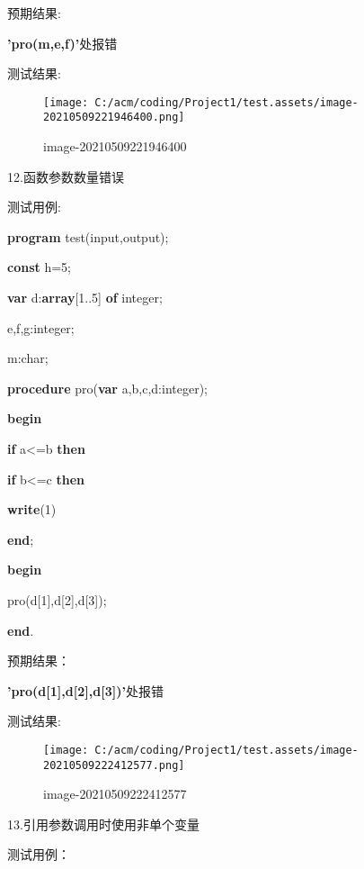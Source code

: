 \documentclass[]{ctexart}
\newenvironment{Shaded}{}{}
\newcommand{\DataTypeTok}[1]{\textcolor[rgb]{0.56,0.13,0.00}{#1}}
\newcommand{\DecValTok}[1]{\textcolor[rgb]{0.25,0.63,0.44}{#1}}
\newcommand{\KeywordTok}[1]{\textcolor[rgb]{0.00,0.44,0.13}{\textbf{#1}}}
\newcommand{\NormalTok}[1]{#1}
\begin{document}
\begin{enumerate}
  预期结果:

  \textbf{'pro(m,e,f)'}处报错

  测试结果:

  \begin{figure}
  \centering
  \texttt{[image: C:/acm/coding/Project1/test.assets/image-20210509221946400.png]}
  \caption{image-20210509221946400}
  \end{figure}

  12.函数参数数量错误

  测试用例:
\end{enumerate}

\begin{Shaded}
\begin{Highlighting}[]
\KeywordTok{program}\NormalTok{ test(input,output);  
}
\KeywordTok{const}\NormalTok{ h=}\DecValTok{5}\NormalTok{;  
}
\KeywordTok{var}\NormalTok{ d:}\KeywordTok{array}\NormalTok{[}\DecValTok{1}\NormalTok{..}\DecValTok{5}\NormalTok{] }\KeywordTok{of} \DataTypeTok{integer}\NormalTok{;  
}
\NormalTok{    e,f,g:}\DataTypeTok{integer}\NormalTok{; 
}
\NormalTok{	m:}\DataTypeTok{char}\NormalTok{; 
}
\KeywordTok{procedure}\NormalTok{ pro(}\KeywordTok{var}\NormalTok{ a,b,c,d:}\DataTypeTok{integer}\NormalTok{);
}
\KeywordTok{begin}  

    \KeywordTok{if}\NormalTok{ a<=b }\KeywordTok{then}  

        \KeywordTok{if}\NormalTok{ b<=c }\KeywordTok{then}  

            \KeywordTok{write}\NormalTok{(}\DecValTok{1}\NormalTok{)   
}
\KeywordTok{end}\NormalTok{;  
}
\KeywordTok{begin} 

\NormalTok{    pro(d[}\DecValTok{1}\NormalTok{],d[}\DecValTok{2}\NormalTok{],d[}\DecValTok{3}\NormalTok{]);
}
\KeywordTok{end}\NormalTok{. }
\end{Highlighting}
\end{Shaded}

预期结果：

\textbf{'pro(d{[}1{]},d{[}2{]},d{[}3{]})'}处报错

测试结果:

\begin{figure}
\centering
\texttt{[image: C:/acm/coding/Project1/test.assets/image-20210509222412577.png]}
\caption{image-20210509222412577}
\end{figure}

13.引用参数调用时使用非单个变量

测试用例：
\end{document}
